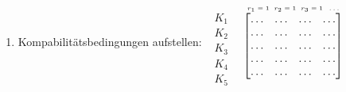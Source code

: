 \documentclass[fleqn,twoside]{article}
\begin{document}
\begin{enumerate}
\begin{enumerate}
\begin{itemize}
                        \end{itemize}
                \end{enumerate}
            \item Kompabilitätsbedingungen aufstellen:\vskip 2mm
                $ \begin{smallmatrix} \phantom{r_1} \\\begin{matrix}  K_1 \\ K_2 \\ K_3 \\ K_4 \\ K_5 \end{matrix} \end{smallmatrix}$ 
                $ \begin{smallmatrix} \textrm{ \tiny $r_1=1 \hspace{1.5mm} r_2=1 \hspace{1.5mm} r_3=1 \hspace{1.5mm} \ldots$ \tiny } \\ \begin{bmatrix}  \ldots &  \ldots &  \ldots &  \ldots \\  \ldots &  \ldots &  \ldots &  \ldots  \\  \ldots &  \ldots &  \ldots &  \ldots  \\  \ldots &  \ldots &  \ldots &  \ldots  \\  \ldots &  \ldots &  \ldots &  \ldots \end{bmatrix} \end{smallmatrix}$

\end{enumerate}
\end{document}
